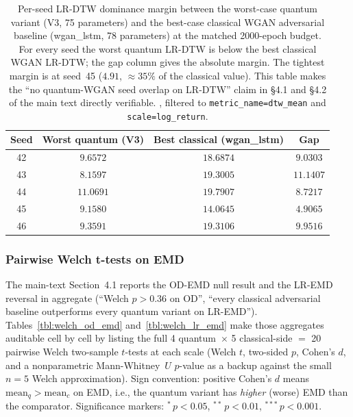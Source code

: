 \begin{table}[!htbp]
\centering
\caption{Per-seed LR-DTW dominance margin between the worst-case quantum
variant (V3, 75 parameters) and the best-case classical WGAN adversarial
baseline (wgan\_lstm, 78 parameters) at the matched 2000-epoch budget.
For every seed the worst quantum LR-DTW is below the best classical WGAN
LR-DTW; the gap column gives the absolute margin. The tightest margin
is at seed~45 ($4.91$, $\approx 35\%$ of the classical value). This table
makes the ``no quantum-WGAN seed overlap on LR-DTW'' claim in
\S4.1 and \S4.2 of the main text directly verifiable. , filtered to
\texttt{metric\_name=dtw\_mean} and \texttt{scale=log\_return}.}
\label{tbl:per_seed_dtw_dominance}
\begin{tabular}{@{}cccc@{}}
\toprule
\textbf{Seed} & \textbf{Worst quantum (V3)} & \textbf{Best classical (wgan\_lstm)} & \textbf{Gap} \\
\midrule
42 & $9.6572$ & $18.6874$ & $9.0303$ \\
43 & $8.1597$ & $19.3005$ & $11.1407$ \\
44 & $11.0691$ & $19.7907$ & $8.7217$ \\
45 & $9.1580$ & $14.0645$ & $4.9065$ \\
46 & $9.3591$ & $19.3106$ & $9.9516$ \\
\bottomrule
\end{tabular}
\end{table}

\subsubsection{Pairwise Welch t-tests on EMD}

The main-text Section~4.1 reports the OD-EMD null result and the
LR-EMD reversal in aggregate (``Welch $p > 0.36$ on OD'', ``every
classical adversarial baseline outperforms every quantum variant on
LR-EMD''). Tables~\ref{tbl:welch_od_emd} and~\ref{tbl:welch_lr_emd}
make those aggregates auditable cell by cell by listing the full 4
quantum~$\times$ 5 classical-side $=$ 20 pairwise Welch two-sample
$t$-tests at each scale (Welch $t$, two-sided $p$, Cohen's $d$, and a
nonparametric Mann-Whitney~$U$ $p$-value as a backup against the small
$n=5$ Welch approximation). Sign convention: positive Cohen's $d$ means
$\mathrm{mean}_q > \mathrm{mean}_c$ on EMD, i.e., the quantum variant
has \emph{higher} (worse) EMD than the comparator. Significance markers:
$^{*}\,p<0.05$, $^{**}\,p<0.01$, $^{***}\,p<0.001$.

